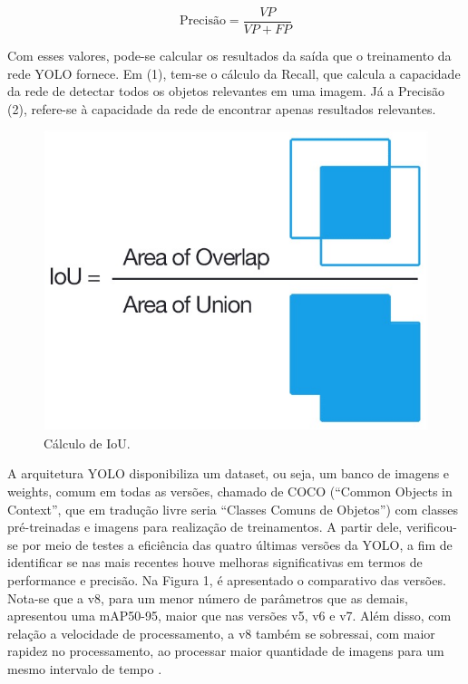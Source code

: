 \begin{equation}
    \text{Precisão} = \frac{VP}{VP + FP} \tag{2}
\end{equation}

Com esses valores, pode-se calcular os resultados da saída que o treinamento da rede YOLO fornece. Em (1), tem-se o cálculo da Recall, que calcula a capacidade da rede de detectar todos os objetos relevantes em uma imagem. Já a Precisão (2), refere-se à capacidade da rede de encontrar apenas resultados relevantes. 

\begin{figure}[!h]
    \center
    \begin{minipage}{0.6\linewidth}
    \center
    \captionsetup{justification=centering,margin=0.5cm,font=small}
    \includegraphics[width=0.7\linewidth]{img/cap2/iou.png}
    \caption{ Cálculo de IoU. \cite{padilla2020survey}} \label{subfig:iou}
    \end{minipage}
\end{figure}

A arquitetura YOLO disponibiliza um dataset, ou seja, um banco de imagens e weights, comum em todas as versões, chamado de COCO (“Common Objects in Context”, que em tradução livre seria “Classes Comuns de Objetos”) com classes pré-treinadas e imagens para realização de treinamentos. A partir dele, verificou-se por meio de testes a eficiência das quatro últimas versões da YOLO, a fim de identificar se nas mais recentes houve melhoras significativas em termos de performance e precisão. Na Figura 1, é apresentado o comparativo das versões. Nota-se que a v8, para um menor número de parâmetros que as demais, apresentou uma mAP50-95, maior que nas versões v5, v6 e v7. Além disso, com relação a velocidade de processamento, a v8 também se sobressai, com maior rapidez no processamento, ao processar maior quantidade de imagens para um mesmo intervalo de tempo \cite{padilla2020survey}.

